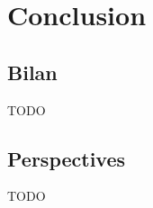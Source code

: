 \documentclass[french]{spimufcphdthesis}
\begin{document}
\part{Conclusion}


\chapter{Bilan}


TODO


\chapter{Perspectives}


TODO



\backmatter




\listoffigures
\listoftables
\listofdefinitions

\end{document}
